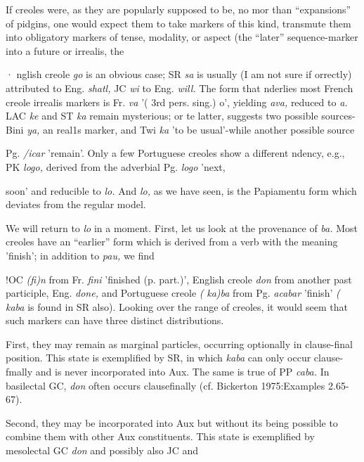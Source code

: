 If creoles were, as they are popularly supposed to be, no mor than ``expansions'' of pidgins, one would expect them to take markers of this kind, transmute them into obligatory markers of tense, modal\-ity, or aspect (the ``later'' sequence-marker into a future or irrealis, the

· nglish creole \textit{go} is an obvious case; SR \textit{sa} is usually (I am not sure if orrectly) attributed to Eng. \textit{shatl,} JC \textit{wi} to Eng. \textit{will.} The form that nderlies most French creole irrealis markers is Fr. \textit{va} '( 3rd pers. sing.) o', yielding \textit{ava,} reduced to \textit{a.} LAC \textit{k}\textit{e} and ST \textit{k}\textit{a} remain mysterious; or te latter, \citet{Ferraz1979} suggests two possible sources-Bini \textit{ya,} an real1s marker, and Twi \textit{ka} 'to be usual'-while another possible source

Pg. \textit{/icar }'remain'. Only a few Portuguese creoles show a different ndency, e.g., PK \textit{logo, }derived from the adverbial Pg. \textit{logo }'next,


soon' and reducible to \textit{lo.} And \textit{lo,} as we have seen, is the Papiamentu form which deviates from the regular model.

We will return to \textit{lo} in a moment. First, let us look at the prove\-nance of \textit{ba.} Most creoles have an ``earlier'' form which is derived from a verb with the meaning 'finish'; in addition to \textit{pau,} we find

!OC \textit{(}\textit{fi)n} from Fr. \textit{fini} 'finished (p. part.)', English creole \textit{don }from another past participle, Eng. \textit{done,} and Portuguese creole \textit{(} \textit{ka)ba }from Pg. \textit{acabar} 'finish' \textit{(} \textit{k}\textit{aba} is found in SR also). Looking over the range of creoles, it would seem that such markers can have three distinct distributions.

First, they may remain as marginal particles, occurring option\-ally in clause-final position. This state is exemplified by SR, in which \textit{kaba} can only occur clause-fmally and is never incorporated into Aux. The same is true of PP \textit{caba.} In basilectal GC, \textit{don} often occurs clause\-finally (cf. Bickerton 1975:Examples 2.65-67).

Second, they may be incorporated into Aux but without its being possible to combine them with other Aux constituents. This state is exemplified by mesolectal GC \textit{don} and possibly also JC and

